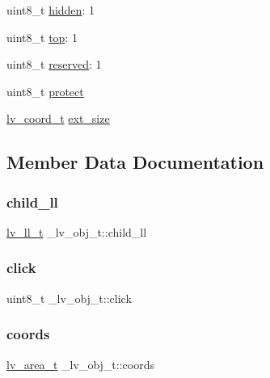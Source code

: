 \begin{DoxyCompactItemize}
\item 
uint8\+\_\+t \mbox{\hyperlink{struct__lv__obj__t_a30ea1c215d3c9e72171d2f0bf367fe80}{hidden}}\+: 1
\item 
uint8\+\_\+t \mbox{\hyperlink{struct__lv__obj__t_af655d7f63d4713ee248868eb9cb995bd}{top}}\+: 1
\item 
uint8\+\_\+t \mbox{\hyperlink{struct__lv__obj__t_a98f692134136e4618ac4b1a9147245e6}{reserved}}\+: 1
\item 
uint8\+\_\+t \mbox{\hyperlink{struct__lv__obj__t_a2b10cb57fa2632b1e89bf517f23e5c7e}{protect}}
\item 
\mbox{\hyperlink{lv__area_8h_ad98932f5017f20988532bb68b32a6d76}{lv\+\_\+coord\+\_\+t}} \mbox{\hyperlink{struct__lv__obj__t_a3e2837c7ca9ab53e6aa643e07dbc468a}{ext\+\_\+size}}
\end{DoxyCompactItemize}


\subsection{Member Data Documentation}
\mbox{\label{struct__lv__obj__t_ad6b65cb2303495c9a2dec63def0fd185}} 
\subsubsection{\texorpdfstring{child\_ll}{child\_ll}}
{\footnotesize\ttfamily \mbox{\hyperlink{structlv__ll__t}{lv\+\_\+ll\+\_\+t}} \+\_\+lv\+\_\+obj\+\_\+t\+::child\+\_\+ll}

\mbox{\label{struct__lv__obj__t_a5aff593ec2b2d1e1461a496569ce2e2c}} 
\subsubsection{\texorpdfstring{click}{click}}
{\footnotesize\ttfamily uint8\+\_\+t \+\_\+lv\+\_\+obj\+\_\+t\+::click}

\mbox{\label{struct__lv__obj__t_a5159a54e860e2efa245ccd12f1f26253}} 
\subsubsection{\texorpdfstring{coords}{coords}}
{\footnotesize\ttfamily \mbox{\hyperlink{structlv__area__t}{lv\+\_\+area\+\_\+t}} \+\_\+lv\+\_\+obj\+\_\+t\+::coords}

